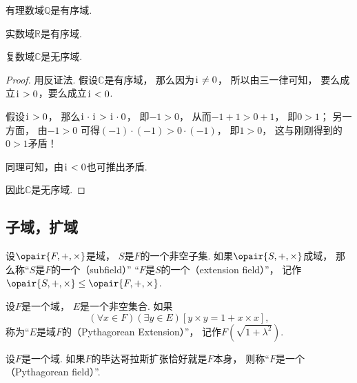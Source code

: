 \begin{theorem}
有理数域\(\mathbb{Q}\)是有序域.
\end{theorem}

\begin{theorem}
实数域\(\mathbb{R}\)是有序域.
\end{theorem}

\begin{theorem}
复数域\(\mathbb{C}\)是无序域.
\begin{proof}
用反证法.
假设\(\mathbb{C}\)是有序域，
那么因为\(\kern1pt\mathrm{i}\kern1pt\neq0\)，
所以由三一律可知，
要么成立\(\kern1pt\mathrm{i}\kern1pt>0\)，要么成立\(\kern1pt\mathrm{i}\kern1pt<0\).

假设\(\kern1pt\mathrm{i}\kern1pt>0\)，
那么\(\kern1pt\mathrm{i}\kern1pt\cdot\kern1pt\mathrm{i}\kern1pt>\kern1pt\mathrm{i}\kern1pt\cdot0\)，
即\(-1>0\)，
从而\(-1+1>0+1\)，
即\(0>1\)；
另一方面，
由\(-1>0\)
可得\((-1)\cdot(-1)>0\cdot(-1)\)，
即\(1>0\)，
这与刚刚得到的\(0>1\)矛盾！

同理可知，由\(\kern1pt\mathrm{i}\kern1pt<0\)也可推出矛盾.

因此\(\mathbb{C}\)是无序域.
\end{proof}
\end{theorem}

\subsection{子域，扩域}
\begin{definition}
设\(\opair{F,+,\times}\)是域，
\(S\)是\(F\)的一个非空子集.
如果\(\opair{S,+,\times}\)成域，
那么称“\(S\)是\(F\)的一个（subfield）”
“\(F\)是\(S\)的一个（extension field）”，
记作\(\opair{S,+,\times}\AlgebraSubstructure\opair{F,+,\times}\).
\end{definition}

\begin{definition}
设\(F\)是一个域，
\(E\)是一个非空集合.
如果\begin{equation*}
	(\forall x \in F)
	(\exists y \in E)
	[
		y \times y
		= 1 + x \times x
	],
\end{equation*}
称为“\(E\)是域\(F\)的（Pythagorean Extension）”，
记作\(F(\sqrt{1+\lambda^2})\).
\end{definition}

\begin{definition}
设\(F\)是一个域.
如果\(F\)的毕达哥拉斯扩张恰好就是\(F\)本身，
则称“\(F\)是一个（Pythagorean field）”.
\end{definition}

